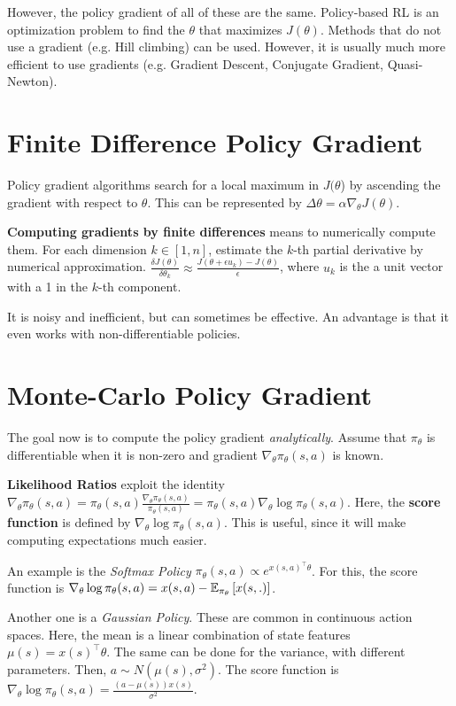 However, the policy gradient of all of these are the same. Policy-based RL is an optimization problem to find the $\theta$ that maximizes $J(\theta)$. Methods that do not use a gradient (e.g. Hill climbing) can be used. However, it is usually much more efficient to use gradients (e.g. Gradient Descent, Conjugate Gradient, Quasi-Newton).

\section{Finite Difference Policy Gradient}

Policy gradient algorithms search for a local maximum in $J(\theta$) by ascending the gradient with respect to $\theta$. This can be represented by $\Delta \theta = \alpha \nabla_\theta J(\theta)$.

\textbf{Computing gradients by finite differences} means to numerically compute them. For each dimension $k \in \left[1, n\right]$, estimate the $k$-th partial derivative by numerical approximation. $\frac{\delta J(\theta)}{\delta \theta_k} \approx \frac{J(\theta + \epsilon u_k) - J(\theta)}{\epsilon}$, where $u_k$ is the a unit vector with a 1 in the $k$-th component.

It is noisy and inefficient, but can sometimes be effective. An advantage is that it even works with non-differentiable policies.

\section{Monte-Carlo Policy Gradient}

The goal now is to compute the policy gradient \textit{analytically}. Assume that $\pi_\theta$ is differentiable when it is non-zero and gradient $\nabla_\theta \pi_\theta(s, a)$ is known.

\textbf{Likelihood Ratios} exploit the identity $\nabla_\theta \pi_\theta(s, a) = \pi_\theta(s, a) \frac{\nabla_\theta \pi_\theta(s, a)}{\pi_\theta(s, a)} = \pi_\theta(s, a) \nabla_\theta \log \pi_\theta(s, a)$. Here, the \textbf{score function} is defined by $\nabla_\theta \log \pi_\theta(s, a)$. This is useful, since it will make computing expectations much easier.

An example is the \textit{Softmax Policy} $\pi_\theta(s, a) \propto e^{x(s, a)^\intercal \theta}$. For this, the score function is $\nabla_\theta \log \pi_\theta(s, a) = x(s, a) - \operatorname{\mathbb{E}}_{\pi_\theta} \left[x(s, .)\right]$. 

Another one is a \textit{Gaussian Policy}. These are common in continuous action spaces. Here, the mean is a linear combination of state features $\mu(s) = x(s)^\intercal \theta$. The same can be done for the variance, with different parameters. Then, $a \sim N(\mu(s), \sigma^2)$. The score function is $\nabla_\theta \log \pi_\theta(s, a) = \frac{(a - \mu(s))x(s)}{\sigma^2}$. 

